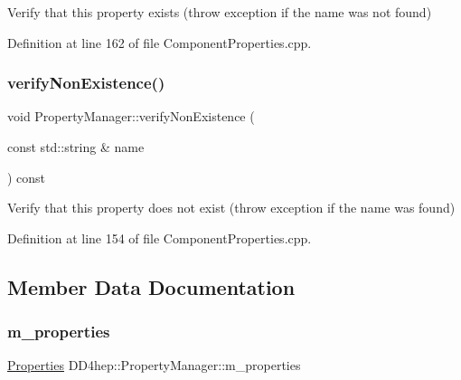Verify that this property exists (throw exception if the name was not found) 



Definition at line 162 of file Component\+Properties.\+cpp.

\hypertarget{class_d_d4hep_1_1_property_manager_a3f9b2e806a1fc63f08e2cdff0039ac5c}{}\label{class_d_d4hep_1_1_property_manager_a3f9b2e806a1fc63f08e2cdff0039ac5c} 
\subsubsection{\texorpdfstring{verify\+Non\+Existence()}{verifyNonExistence()}}
{\footnotesize\ttfamily void Property\+Manager\+::verify\+Non\+Existence (\begin{DoxyParamCaption}\item[{const std\+::string \&}]{name }\end{DoxyParamCaption}) const\hspace{0.3cm}{\ttfamily [protected]}}



Verify that this property does not exist (throw exception if the name was found) 



Definition at line 154 of file Component\+Properties.\+cpp.



\subsection{Member Data Documentation}
\hypertarget{class_d_d4hep_1_1_property_manager_af966b46276f15f24b36f7e88006bd098}{}\label{class_d_d4hep_1_1_property_manager_af966b46276f15f24b36f7e88006bd098} 
\subsubsection{\texorpdfstring{m\+\_\+properties}{m\_properties}}
{\footnotesize\ttfamily \hyperlink{class_d_d4hep_1_1_property_manager_af9bc1c909d5489219e0f9e97b16dab6f}{Properties} D\+D4hep\+::\+Property\+Manager\+::m\+\_\+properties\hspace{0.3cm}{\ttfamily [protected]}}



